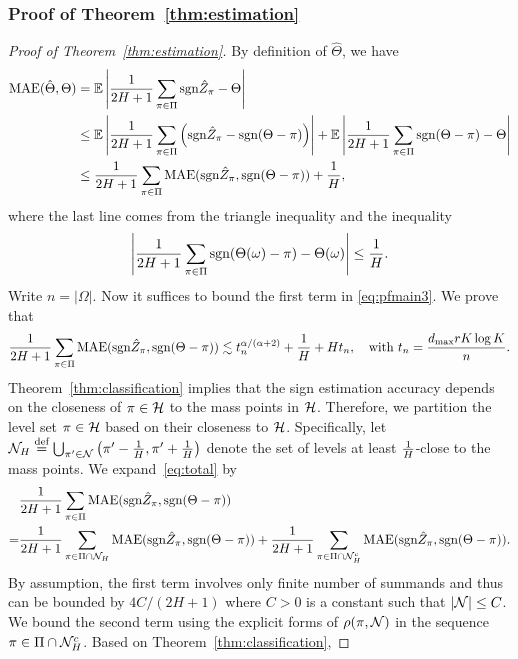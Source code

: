 \documentclass[11pt]{article}
\theoremstyle{plain}
\theoremstyle{definition}
\def\sign{\textup{sgn}}
\begin{document}
\subsubsection{Proof of Theorem~\ref{thm:estimation}}
\begin{proof}[Proof of Theorem~\ref{thm:estimation}]
By definition of $\hat\Theta$, we have
\begin{align}\label{eq:pfmain3}\nonumber
\text{MAE}(\hat\Theta,\Theta) &= \mathbb{E}\left|\frac{1}{2H+1}\sum_{\pi\in\Pi}\sign\hat Z_\pi-\Theta\right|\\\nonumber
&\leq \mathbb{E}\left|\frac{1}{2H+1}\sum_{\pi\in\Pi}\left(\sign\hat Z_\pi-\sign(\Theta-\pi)\right)\right|+\mathbb{E}\left|\frac{1}{2H+1}\sum_{\pi\in\Pi}\sign(\Theta-\pi)-\Theta\right|\\&
\leq \frac{1}{2H+1}\sum_{\pi\in\Pi}\text{MAE}(\sign\hat Z_\pi,\sign(\Theta-\pi))+\frac{1}{H},
\end{align}
where the last line comes  from the triangle inequality and the inequality
\begin{equation}
\left|\frac{1}{2H+1}\sum_{\pi\in\Pi}\sign(\Theta(\omega)-\pi)-\Theta(\omega)\right|\leq \frac{1}{H}.
\end{equation}
Write $n=|\Omega|$. Now it suffices to bound  the first term in \eqref{eq:pfmain3}.  We prove that 
\begin{equation}\label{eq:total}
{1\over 2H+1}\sum_{\pi \in \Pi} \textup{MAE}(\sign \hat Z_\pi, \sign (\Theta-\pi)) \lesssim  t_n^{\alpha/(\alpha+2)}+{1\over H}+ H t_n, \quad \text{with } t_n={d_{\max}rK\log K\over n}.
\end{equation}
Theorem~\ref{thm:classification} implies that the  sign estimation accuracy depends on the closeness of $\pi\in \mathcal{H}$ to the mass points in $\mathcal{H}$. Therefore, we partition the level set $\pi \in \mathcal{H}$ based on their closeness to $\mathcal{H}$. Specifically, let $\mathcal{N}_H \stackrel{\text{def}}{=}\bigcup_{\pi'\in\mathcal{N}}\left(\pi'-\frac{1}{H},\pi'+\frac{1}{H}\right)$ denote the set of levels at least $1\over H$-close to the mass points. We expand~\eqref{eq:total} by
\begin{align}\label{eq:twobounds}
&{1\over 2H+1}\sum_{\pi \in \Pi} \textup{MAE}(\sign \hat Z_\pi, \sign (\Theta-\pi))\notag \\
=&{1\over 2H+1}\sum_{\pi \in \Pi\cap \tN_H} \textup{MAE}(\sign \hat Z_\pi, \sign (\Theta-\pi))+{1\over 2H+1}\sum_{\pi \in \Pi\cap \tN_H^c} \textup{MAE}(\sign \hat Z_\pi, \sign (\Theta-\pi)).
\end{align}
By assumption, the first term involves only finite number of summands and thus can be bounded by $4C/ (2H+1)$ where $C>0$ is a constant such that $|\mathcal{N}|\leq C$.  We bound the second term using the explicit forms of $\rho(\pi, \mathcal{N})$ in the sequence $\pi \in\Pi\cap \mathcal{N}_H^c$. Based on Theorem~\ref{thm:classification}, 

\end{proof}
\end{document}
